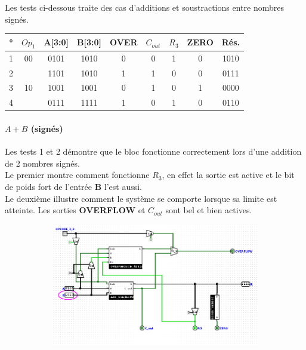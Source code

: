 \documentclass[a4paper]{article}
\begin{document}
\begin{tcolorbox}[colframe=Monokaimagenta,colback=white]
Les tests ci-dessous traite des cas d'additions et soustractions entre nombres signés.\\
\begin{center}


\begin{tabular}{|c|c|c|c||c|c|c|c|c|}
    \hline
     ° & $Op_1$ & A[3:0] & B[3:0] & OVER & $C_{out}$ & $R_3$ & ZERO & Rés. \\
    \hline
    1  & 00     & 0101   & 1010   & 0    &  0        &   1   &  0   & 1010\\
    2  &        & 1101   & 1010   & 1    &  1        &   0   &  0   & 0111 \\
    \hline
    3  & 10     & 1001   & 1001   & 0    &  1        &   0   &  1   & 0000\\
    4  &        & 0111   & 1111   & 1    &  0        &   1   &  0   & 0110\\
    \hline
    
\end{tabular}



\end{center}
\paragraph{$A+B$ (signés)}
Les tests 1 et 2 démontre que le bloc fonctionne correctement lors d'une addition de 2 nombres signés.\\
Le premier montre comment fonctionne $R_3$, en effet la sortie est active et le bit de poids fort de l'entrée \textbf{B} l'est aussi.\\
Le deuxième illustre comment le système se comporte lorsque sa limite est atteinte. Les sorties \textbf{OVERFLOW} et $C_{out}$ sont bel et bien actives.
\begin{figure}[H]
    \centering
    
    \begin{subfigure}{.7\textwidth}
        \centering
        \includegraphics[width=.8\linewidth]{src/ADDSUB_TEST_AplB.png}
        \label{fig:COMPARATEUR_EXEMPLE}
   \end{subfigure}
   

\end{figure}
\end{tcolorbox}
\end{document}
